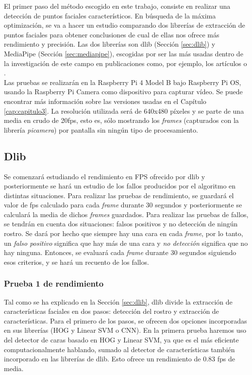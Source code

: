 El primer paso del método escogido en este trabajo, consiste en realizar una detección de puntos faciales característicos. En búsqueda de la máxima optimización, se va a hacer un estudio comparando dos librerías de extracción de puntos faciales para obtener conclusiones de cual de ellas nos ofrece más rendimiento y precisión. Las dos librerías son dlib (Sección \ref{sec:dlib}) y MediaPipe (Sección \ref{sec:mediapipe}), escogidas por ser las más usadas dentro de la investigación de este campo en publicaciones como, por ejemplo, los artículos \cite{dlib_emotions} o \cite{mediapipe_emotions}.\\

Las pruebas se realizarán en la Raspberry Pi 4 Model B bajo Raspberry Pi OS, usando la Raspberry Pi Camera como dispositivo para capturar vídeo. Se puede encontrar más información sobre las versiones usadas en el Capítulo \ref{cap:capitulo3}. La resolución utilizada será de 640x480 píxeles y se parte de una media en crudo de 20fps, esto es, sólo mostrando los \textit{frames} (capturados con la librería \textit{picamera}) por pantalla sin ningún tipo de procesamiento.

\subsection{Dlib}

Se comenzará estudiando el rendimiento en FPS ofrecido por dlib y posteriormente se hará un estudio de los fallos producidos por el algoritmo en distintas situaciones. Para realizar las pruebas de rendimiento, se guardará el valor de fps calculado para cada \textit{frame} durante 30 segundos y posteriormente se calculará la media de dichos \textit{frames} guardados. Para realizar las pruebas de fallos, se tendrán en cuenta dos situaciones: falsos positivos y no detección de ningún rostro. Se dará por hecho que siempre hay una cara en cada \textit{frame}, por lo tanto, un \textit{falso positivo} significa que hay más de una cara y \textit{no detección} significa que no hay ninguna. Entonces, se evaluará cada \textit{frame} durante 30 segundos siguiendo esos criterios, y se hará un recuento de los fallos.

\subsubsection{Prueba 1 de rendimiento}

Tal como se ha explicado en la Sección \ref{sec:dlib}, dlib divide la extracción de características faciales en dos pasos: detección del rostro y extracción de características. Para el primero de los pasos, se ofrecen dos opciones incorporadas en sus librerías (HOG y Linear SVM o CNN). En la primera prueba haremos uso del detector de caras basado en HOG y Linear SVM, ya que es el más eficiente computacionalmente hablando, sumado al detector de características también incorporado en las librerías de dlib. Esto ofrece un rendimiento de 0.83 fps de media.

